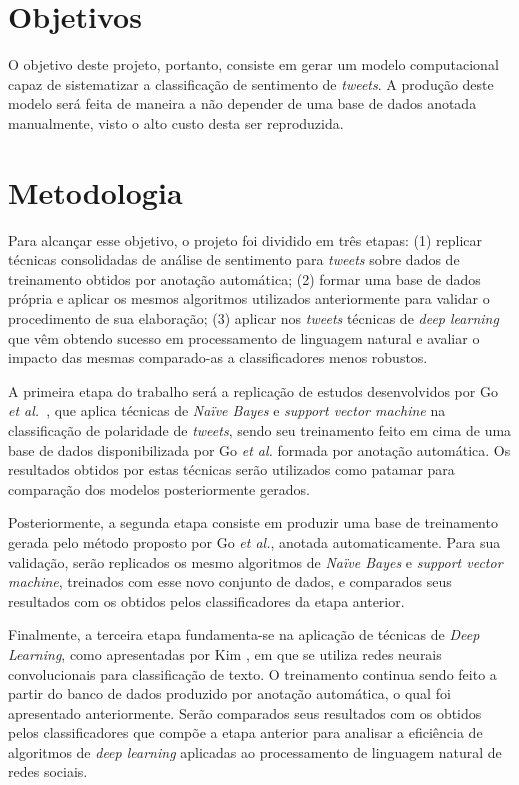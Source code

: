 \section{Objetivos}

O objetivo deste projeto, portanto, consiste em gerar um modelo computacional capaz de sistematizar a classificação de
sentimento de \textit{tweets}.
A produção deste modelo será feita de maneira a não depender de uma base de dados anotada manualmente, visto o alto
custo desta ser reproduzida.

\section{Metodologia}

Para alcançar esse objetivo, o projeto foi dividido em três etapas: (1) replicar técnicas consolidadas de análise de
sentimento para \textit{tweets} sobre dados de treinamento obtidos por anotação automática; (2) formar uma base de dados
própria e aplicar os mesmos algoritmos utilizados anteriormente para validar o procedimento de sua elaboração; (3)
aplicar nos \textit{tweets} técnicas de \textit{deep learning} que vêm obtendo sucesso em processamento de linguagem
natural e avaliar o impacto das mesmas comparado-as a classificadores menos robustos.

A primeira etapa do trabalho será a replicação de estudos desenvolvidos por Go \textit{et al.}~\cite{go09}, que aplica
técnicas de \textit{Naïve Bayes} e \textit{support vector machine} na classificação de polaridade de \textit{tweets},
sendo seu treinamento feito em cima de uma base de dados disponibilizada por Go \textit{et al.} formada por anotação
automática.
Os resultados obtidos por estas técnicas serão utilizados como patamar para comparação dos modelos posteriormente
gerados.

Posteriormente, a segunda etapa consiste em produzir uma base de treinamento gerada pelo método proposto por Go
\textit{et al.}, anotada automaticamente.
Para sua validação, serão replicados os mesmo algoritmos de \textit{Naïve Bayes} e \textit{support vector machine},
treinados com esse novo conjunto de dados, e comparados seus resultados com os obtidos pelos classificadores da etapa
anterior.

Finalmente, a terceira etapa fundamenta-se na aplicação de técnicas de \textit{Deep Learning}, como apresentadas por
Kim \cite{kim14}, em que se utiliza redes neurais convolucionais para classificação de texto.
O treinamento continua sendo feito a partir do banco de dados produzido por anotação automática, o qual foi apresentado
anteriormente.
Serão comparados seus resultados com os obtidos pelos classificadores que compõe a etapa anterior para analisar a
eficiência de algoritmos de \textit{deep learning} aplicadas ao processamento de linguagem natural de redes sociais.

